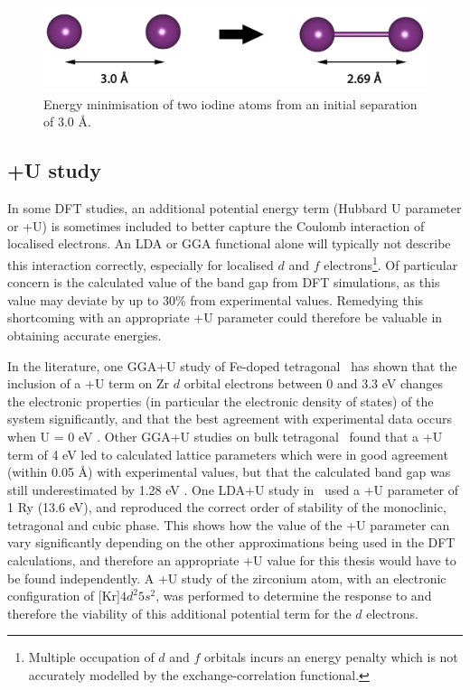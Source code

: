 \begin{figure}[ht] %
\centering
\includegraphics[width=14cm]{images/iodine_molecule.png}
\caption{Energy minimisation of two iodine atoms from an initial separation of 3.0 \r{A}.}
\label{figure:iodine_dimer}
\end{figure}

\subsection{+U study}
\label{subsection:plus_U}

In some DFT studies, an additional potential energy term (Hubbard U parameter or +U) is sometimes included to better capture the Coulomb interaction of localised electrons. An LDA or GGA functional alone will typically not describe this interaction correctly, especially for localised $d$ and $f$ electrons\footnote{Multiple occupation of $d$ and $f$ orbitals incurs an energy penalty which is not accurately modelled by the exchange-correlation functional.}. Of particular concern is the calculated value of the band gap from DFT simulations, as this value may deviate by up to 30\% from experimental values. Remedying this shortcoming with an appropriate +U parameter could therefore be valuable in obtaining accurate energies. 

In the literature, one GGA+U study of Fe-doped tetragonal \zirconia\ has shown that the inclusion of a +U term on Zr $d$ orbital electrons between 0 and 3.3 eV changes the electronic properties (in particular the electronic density of states) of the system significantly, and that the best agreement with experimental data occurs when U = 0 eV \cite{Sangalli2013}. Other GGA+U studies on bulk tetragonal \zirconia\ found that a +U term of 4 eV led to calculated lattice parameters which were in good agreement (within 0.05 \r{A}) with experimental values, but that the calculated band gap was still underestimated by 1.28 eV \cite{RuizPuigdollers2016, Chen2015, Puigdollers2015}. One LDA+U study in \zirconia\ used a +U parameter of 1 Ry (13.6 eV), and reproduced the correct order of stability of the monoclinic, tetragonal and cubic phase. This shows how the value of the +U parameter can vary significantly depending on the other approximations being used in the DFT calculations, and therefore an appropriate +U value for this thesis would have to be found independently. A +U study of the zirconium atom, with an electronic configuration of [Kr]$4d^{2}5s^{2}$, was performed to determine the response to and therefore the viability of this additional potential term for the $d$ electrons.

